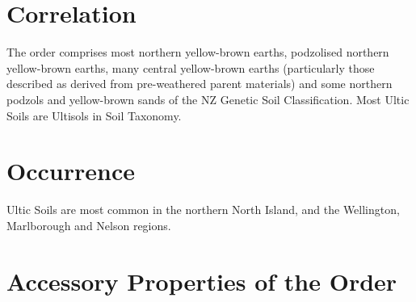 \documentclass[
  letterpaper,
  DIV=11,
  numbers=noendperiod]{scrreprt}
\begin{document}
\hypertarget{sec-cor-U}{%
\section{Correlation}\label{sec-cor-U}}

The order comprises most northern yellow-brown earths, podzolised
northern yellow-brown earths, many central yellow-brown earths
(particularly those described as derived from pre-weathered parent
materials) and some northern podzols and yellow-brown sands of the NZ
Genetic Soil Classification. Most Ultic Soils are Ultisols in Soil
Taxonomy.

\hypertarget{sec-occ-U}{%
\section{Occurrence}\label{sec-occ-U}}

Ultic Soils are most common in the northern North Island, and the
Wellington, Marlborough and Nelson regions.

\hypertarget{sec-acc-U}{%
\section{Accessory Properties of the Order}\label{sec-acc-U}}
\end{document}
